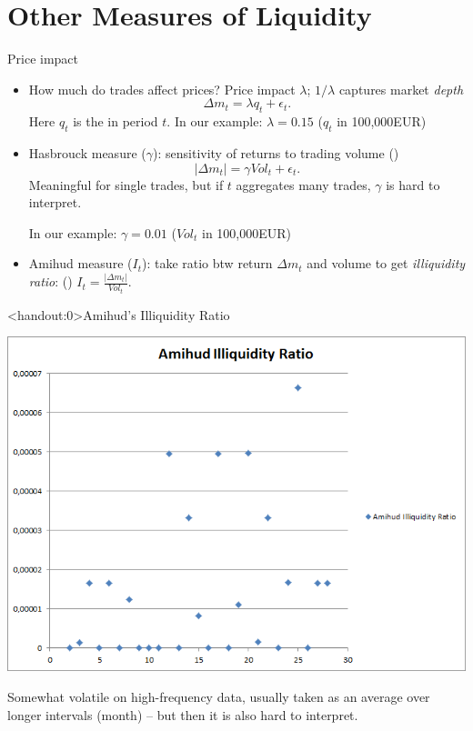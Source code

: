 \documentclass[english,10pt
,aspectratio=169
]{beamer}
\begin{document}
\section{Other Measures of Liquidity}


\begin{frame}{Price impact}
\begin{itemize}
	\item How much do trades affect prices? \alert{Price impact} $\lambda$;  $1/\lambda$ captures market \textit{depth}
	\[
	\Delta m_t = \lambda q_t + \epsilon_t.
	\]
	Here $q_t$ is the  in period $t$. 	
	In our example: $\lambda = 0.15 $ ($q_t$ in 100,000EUR)
	
	\pause
	\item \alert{Hasbrouck measure} ($\gamma$): sensitivity of returns to trading volume (\citet{hasbrouck_empirical_2007})
	\[
	|\Delta m_t | = \gamma Vol_t + \epsilon_t.
	\]
	Meaningful for single trades, but if $t$ aggregates many trades, $\gamma$ is hard to interpret.
	
	In our example: $\gamma = 0.01$ ($Vol_t$ in 100,000EUR)
	
	\pause
	\item \alert{Amihud measure} ($I_t$): take ratio btw return $\Delta m_t$ and volume to get \textit{illiquidity ratio}: (\citet{amihud_illiquidity_2002})
	\center
	$I_t = \frac{|\Delta m_t|}{Vol_t}$.
\end{itemize}
\end{frame}


\begin{frame}<handout:0>{Amihud's Illiquidity Ratio}
	\begin{center}
		\includegraphics[scale=0.39]{pics/L2_Amihud}
	\end{center}
	Somewhat volatile on high-frequency data, usually taken as an average over longer intervals (month) -- but then it is also hard to interpret.
\end{frame}
\end{document}
